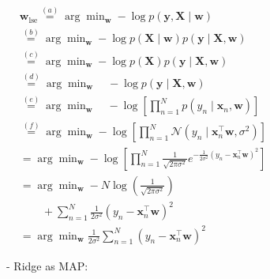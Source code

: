 $
\begin{aligned}
& \mathbf{w}_{\mathrm{lse}} \stackrel{(a)}{=} \arg \min _{\mathbf{w}}-\log p(\mathbf{y}, \mathbf{X} \mid \mathbf{w}) \\
& \stackrel{(b)}{=} \arg \min _{\mathbf{w}}-\log p(\mathbf{X} \mid \mathbf{w}) p(\mathbf{y} \mid \mathbf{X}, \mathbf{w}) \\
& \stackrel{(c)}{=} \arg \min _{\mathbf{w}}-\log p(\mathbf{X}) p(\mathbf{y} \mid \mathbf{X}, \mathbf{w}) \\
& \stackrel{(d)}{=} \arg \min _{\mathbf{w}} \quad-\log p(\mathbf{y} \mid \mathbf{X}, \mathbf{w}) \\
& \stackrel{(e)}{=} \arg \min _{\mathbf{w}} \quad-\log \left[\prod_{n=1}^{N} p\left(y_{n} \mid \mathbf{x}_{n}, \mathbf{w}\right)\right] \\
& \stackrel{(f)}{=} \arg \min _{\mathbf{w}}-\log \left[\prod_{n=1}^{N} \mathcal{N}\left(y_{n} \mid \mathbf{x}_{n}^{\top} \mathbf{w}, \sigma^{2}\right)\right] \\
& =\arg \min _{\mathbf{w}}-\log \left[\prod_{n=1}^{N} \frac{1}{\sqrt{2 \pi \sigma^{2}}} e^{-\frac{1}{2 \sigma^{2}}\left(y_{n}-\mathbf{x}_{n}^{\top} \mathbf{w}\right)^{2}}\right] \\
& =\arg \min _{\mathbf{w}}-N \log \left(\frac{1}{\sqrt{2 \pi \sigma^{2}}}\right)
\\ & 
\qquad +\sum_{n=1}^{N} \frac{1}{2 \sigma^{2}}\left(y_{n}-\mathbf{x}_{n}^{\top} \mathbf{w}\right)^{2} \\
& =\arg \min _{\mathbf{w}} \frac{1}{2 \sigma^{2}} \sum_{n=1}^{N}\left(y_{n}-\mathbf{x}_{n}^{\top} \mathbf{w}\right)^{2}
\end{aligned}
$

- Ridge as MAP:


